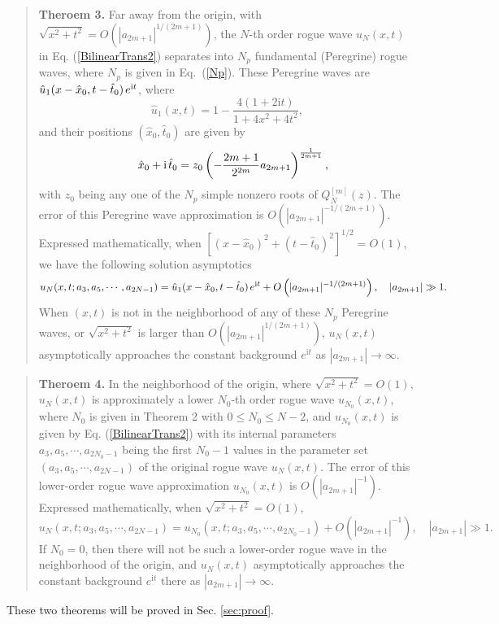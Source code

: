 \documentclass[amsmath,amssymb]{revtex4}
\def\[{\begin{equation}}
\def\]{\end{equation}}
\begin{document}
\begin{quote}
\textbf{Theroem 3.}
Far away from the origin, with $\sqrt{x^2+t^2}=O\left(|a_{2m+1}|^{1/(2m+1)}\right)$, the $N$-th order rogue wave $u_N(x,t)$ in Eq. (\ref{BilinearTrans2}) separates into $N_p$ fundamental (Peregrine) rogue waves, where $N_p$ is given in Eq.~(\ref{Np}). These Peregrine waves are $\hat{u}_1(x-\hat{x}_{0}, t-\hat{t}_{0}) \hspace{0.05cm} e^{\textrm{i}t}$, where
\begin{equation} \label{Pere}
\hat{u}_1(x, t)=1- \frac{4(1+2\textrm{i}t)}{1+4x^2+4t^2},
\end{equation}
and their positions $(\hat{x}_{0}, \hat{t}_{0})$ are given by
\begin{eqnarray}
&&\hat{x}_{0}+\textrm{i}\hspace{0.05cm}\hat{t}_{0}=
z_{0}\left(-\frac{2m+1}{2^{2m}}a_{2m+1}\right)^{\frac{1}{2m+1}}, \label{x0t0}
\end{eqnarray}
with $z_{0}$ being any one of the $N_p$ simple nonzero roots of $Q_{N}^{[m]}(z)$. The error of this Peregrine wave approximation is $O(|a_{2m+1}|^{-1/(2m+1)})$. Expressed mathematically, when $\left[(x-\hat{x}_{0})^2+(t-\hat{t}_{0})^2\right]^{1/2}=O(1)$, we have the following solution asymptotics
\[ \label{Theorem3asym}
u_{N}(x,t; a_{3}, a_{5}, \cdots, a_{2N-1}) = \hat{u}_1(x-\hat{x}_{0},t-\hat{t}_{0})\hspace{0.05cm} e^{\textrm{i}t} + O\left(|a_{2m+1}|^{-1/(2m+1)}\right), \quad |a_{2m+1}|\gg 1.
\]
When $(x,t)$ is not in the neighborhood of any of these $N_p$ Peregrine waves, or $\sqrt{x^2+t^2}$ is larger than $O\left(|a_{2m+1}|^{1/(2m+1)}\right)$, $u_N(x,t)$ asymptotically approaches the constant background $e^{\textrm{i}t}$ as $|a_{2m+1}|\to \infty$.
\end{quote}

\begin{quote}
\textbf{Theroem 4.} In the neighborhood of the origin, where $\sqrt{x^2+t^2}=O(1)$, $u_N(x,t)$ is approximately a lower $N_0$-th order rogue wave $u_{N_0}(x,t)$, where $N_0$ is given in Theorem 2 with $0\le N_0\le N-2$, and $u_{N_0}(x,t)$ is given by Eq. (\ref{BilinearTrans2}) with its internal parameters $a_3, a_5, \cdots, a_{2N_0-1}$ being the first $N_0-1$ values in the parameter set $(a_3, a_5, \cdots, a_{2N-1})$ of the original rogue wave $u_N(x,t)$. The error of this lower-order rogue wave approximation $u_{N_0}(x,t)$ is $O(|a_{2m+1}|^{-1})$. Expressed mathematically, when $\sqrt{x^2+t^2}=O(1)$,
\[ \label{ucenter}
u_{N}(x,t; a_{3}, a_{5}, \cdots, a_{2N-1}) = u_{N_{0}}(x,t; a_{3}, a_{5}, \cdots, a_{2N_{0}-1})+ O\left(|a_{2m+1}|^{-1}\right), \quad |a_{2m+1}|\gg 1.
\]
If $N_0=0$, then there will not be such a lower-order rogue wave in the neighborhood of the origin, and $u_N(x,t)$ asymptotically approaches the constant background $e^{\textrm{i}t}$ there as $|a_{2m+1}|\to \infty$.
\end{quote}
These two theorems will be proved in Sec. \ref{sec:proof}.
\end{document}
